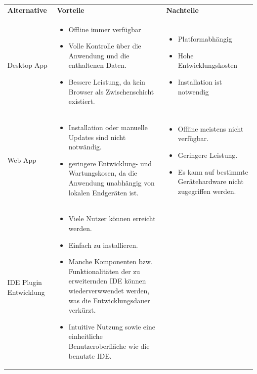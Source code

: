 \begin{table}
	\centering
		\begin{tabular}{ |p{3cm}|p{6cm}|p{6cm}| }
			\hline
			\textbf{Alternative} & \textbf{Vorteile} &  \textbf{Nachteile}  \\
			Desktop App & 
			\begin{itemize}
				\item Offline immer verfügbar
				\item Volle Kontrolle über die Anwendung und die enthaltenen Daten.
				\item Bessere Leistung, da kein Browser als Zwischenschicht existiert.
			\end{itemize}& 
			\begin{itemize}
				\item Platformabhängig
				\item Hohe Entwicklungskosten
				\item Installation ist notwendig
			\end{itemize} \\
			\hline
			Web App &
			
			\begin{itemize}
				\item Installation oder manuelle Updates sind nicht notwändig. 
				\item geringere Entwicklung- und Wartungskosen, da die Anwendung unabhängig von lokalen Endgeräten ist.
			\end{itemize} &
		
			\begin{itemize}
				\item Offline meistens nicht verfügbar.
				\item Geringere Leistung.
				\item Es kann auf bestimmte Gerätehardware nicht zugegriffen werden.
			\end{itemize} \\
			\hline
			IDE Plugin Entwicklung &
			
			\begin{itemize}
				\item Viele Nutzer können erreicht werden.
				\item Einfach zu installieren.
				\item Manche Komponenten bzw. Funktionalitäten der zu erweiternden IDE können wiederverwwendet werden, was die Entwicklungsdauer verkürzt.
				\item Intuitive Nutzung sowie eine einheitliche Benutzeroberfläche wie die benutzte IDE.
			\end{itemize} &
			

\end{tabular}
\end{table}
